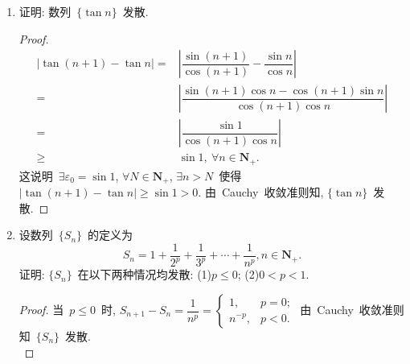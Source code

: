 \documentclass[UTF8,a4paper,10pt,twoside]{book}
\begin{document}
\begin{enumerate}
\begin{proof}
		      假设已经找出了~$x_{n_k}$, 使得~$x_{n_k}>x_{n_{k-1}}$, $x_{n_{k}}>M_k=k$, 则对于~$M_{k+1}=k+1$, $\exists n_{k+1}\in\mathbf{N}_{+}, n_{k+1}>n_{k}$, 使得~$x_{n_{k+1}}>k+1$, 断言这样的~$n_{k+1}$~是可以找到的, 否则~$\forall n>n_k$, $x_n\leqslant M_{k+1}$, 与~$\{x_n\}$~无界矛盾. 由数学归纳法可知找出了数列~$\{x_{n_{k}}\}$~使得~$n_1<n_2<\cdots<n_k<n_{k+1}<\cdots$, $x_{n_k}>k, k\in\mathbf{N}_{+}$. 这说明~$\{x_{n_k}\}$~是~$\{x_n\}$~的子列, 并且~$\{x_{n_k}\}$~是正的无穷大量. 同理若~$\{x_n\}$~无下界时可找到一个子列是负的无穷大量.\qedhere
	      \end{proof}
	\item 证明: 数列~$\{\tan{n}\}$~发散.
	      \begin{proof}
		      \begin{equation*}
			      \begin{split}
				      |\tan(n+1)-\tan{n}|=&\left|\dfrac{\sin(n+1)}{\cos(n+1)}-\dfrac{\sin{n}}{\cos{n}}\right|\\
				      =&\left|\dfrac{\sin(n+1)\cos{n}-\cos(n+1)\sin{n}}{\cos(n+1)\cos{n}}\right|\\
				      =&\left|\dfrac{\sin{1}}{\cos(n+1)\cos{n}}\right|\\
				      \geqslant&\sin{1},\ \forall n\in\mathbf{N}_{+}.
			      \end{split}
		      \end{equation*}
		      这说明~$\exists\varepsilon_0=\sin{1}$, $\forall N\in\mathbf{N}_{+}$, $\exists n>N$~使得~$|\tan(n+1)-\tan{n}|\geqslant\sin{1}>0$. 由~Cauchy~收敛准则知, $\{\tan{n}\}$~发散.\qedhere
	      \end{proof}
	\item 设数列~$\{S_n\}$~的定义为
	      \[
		      S_n=1+\dfrac{1}{2^p}+\dfrac{1}{3^p}+\cdots+\dfrac{1}{n^p}, n\in\mathbf{N}_{+}.
	      \]
	      证明: $\{S_n\}$~在以下两种情况均发散: (1)$p\leqslant 0$; (2)$0<p<1$.
	      \begin{proof}
		      当~$p\leqslant 0$~时, $S_{n+1}-S_n=\dfrac{1}{n^p}=\begin{cases}1, & p=0;\\ n^{-p}, & p<0.\end{cases}$ 由~Cauchy~收敛准则知~$\{S_n\}$~发散.\\


\end{proof}
\end{enumerate}
\end{document}
